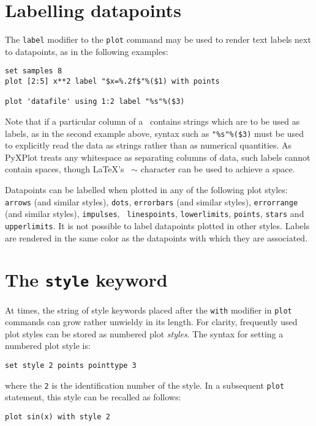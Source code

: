 \section{Labelling datapoints}

The {\tt label} modifier to the {\tt plot} command may be used to render text
labels next to datapoints, as in the following examples:
\begin{verbatim}
set samples 8
plot [2:5] x**2 label "$x=%.2f$"%($1) with points

plot 'datafile' using 1:2 label "%s"%($3)
\end{verbatim}

\noindent Note that if a particular column of a \datafile\ contains strings
which are to be used as labels, as in the second example above, syntax such as
{\tt "\%s"\%(\$3)} must be used to explicitly read the data as strings rather
than as numerical quantities.  As PyXPlot treats any whitespace as separating
columns of data, such labels cannot contain spaces, though \LaTeX's {\tt
$\sim$} character can be used to achieve a space.

Datapoints can be labelled when plotted in any of the following plot styles:
{\tt arrows} (and similar styles), {\tt dots}, {\tt errorbars} (and similar
styles), {\tt errorrange} (and similar styles), {\tt impulses}, {\tt
linespoints}, {\tt lowerlimits}, {\tt points}, {\tt stars} and {\tt
upperlimits}. It is not possible to label datapoints plotted in other styles.
Labels are rendered in the same color as the datapoints with which they are
associated.

\section{The {\tt style} keyword}

At times, the string of style keywords placed after the {\tt with} modifier in
{\tt plot} commands can grow rather unwieldy in its length. For clarity,
frequently used plot styles can be stored as numbered plot {\it styles}.  The
syntax for setting a numbered plot style is:

\begin{verbatim}
set style 2 points pointtype 3
\end{verbatim}

\noindent where the {\tt 2} is the identification number of the style. In a
subsequent {\tt plot} statement, this style can be recalled as follows:

\begin{verbatim}
plot sin(x) with style 2
\end{verbatim}

